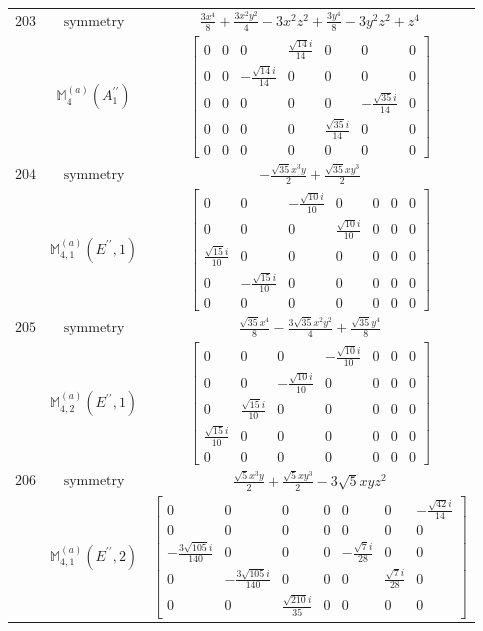 \documentclass[fleqn,8pt,landscape]{jsarticle}
\begin{document}
\begin{longtable}{ccc}
$ 203 $ & $ \text{symmetry} $ & $ \frac{3 x^{4}}{8} + \frac{3 x^{2} y^{2}}{4} - 3 x^{2} z^{2} + \frac{3 y^{4}}{8} - 3 y^{2} z^{2} + z^{4} $ \\
$  $ & $ \mathbb{M}_{4}^{(a)}(A_{1}^{\prime\prime}) $ & $ \begin{bmatrix} 0 & 0 & 0 & \frac{\sqrt{14} i}{14} & 0 & 0 & 0 \\ 0 & 0 & - \frac{\sqrt{14} i}{14} & 0 & 0 & 0 & 0 \\ 0 & 0 & 0 & 0 & 0 & - \frac{\sqrt{35} i}{14} & 0 \\ 0 & 0 & 0 & 0 & \frac{\sqrt{35} i}{14} & 0 & 0 \\ 0 & 0 & 0 & 0 & 0 & 0 & 0 \end{bmatrix} $ \\ \hline
$ 204 $ & $ \text{symmetry} $ & $ - \frac{\sqrt{35} x^{3} y}{2} + \frac{\sqrt{35} x y^{3}}{2} $ \\
$  $ & $ \mathbb{M}_{4,1}^{(a)}(E^{\prime\prime},1) $ & $ \begin{bmatrix} 0 & 0 & - \frac{\sqrt{10} i}{10} & 0 & 0 & 0 & 0 \\ 0 & 0 & 0 & \frac{\sqrt{10} i}{10} & 0 & 0 & 0 \\ \frac{\sqrt{15} i}{10} & 0 & 0 & 0 & 0 & 0 & 0 \\ 0 & - \frac{\sqrt{15} i}{10} & 0 & 0 & 0 & 0 & 0 \\ 0 & 0 & 0 & 0 & 0 & 0 & 0 \end{bmatrix} $ \\ \hline
$ 205 $ & $ \text{symmetry} $ & $ \frac{\sqrt{35} x^{4}}{8} - \frac{3 \sqrt{35} x^{2} y^{2}}{4} + \frac{\sqrt{35} y^{4}}{8} $ \\
$  $ & $ \mathbb{M}_{4,2}^{(a)}(E^{\prime\prime},1) $ & $ \begin{bmatrix} 0 & 0 & 0 & - \frac{\sqrt{10} i}{10} & 0 & 0 & 0 \\ 0 & 0 & - \frac{\sqrt{10} i}{10} & 0 & 0 & 0 & 0 \\ 0 & \frac{\sqrt{15} i}{10} & 0 & 0 & 0 & 0 & 0 \\ \frac{\sqrt{15} i}{10} & 0 & 0 & 0 & 0 & 0 & 0 \\ 0 & 0 & 0 & 0 & 0 & 0 & 0 \end{bmatrix} $ \\ \hline
$ 206 $ & $ \text{symmetry} $ & $ \frac{\sqrt{5} x^{3} y}{2} + \frac{\sqrt{5} x y^{3}}{2} - 3 \sqrt{5} x y z^{2} $ \\
$  $ & $ \mathbb{M}_{4,1}^{(a)}(E^{\prime\prime},2) $ & $ \begin{bmatrix} 0 & 0 & 0 & 0 & 0 & 0 & - \frac{\sqrt{42} i}{14} \\ 0 & 0 & 0 & 0 & 0 & 0 & 0 \\ - \frac{3 \sqrt{105} i}{140} & 0 & 0 & 0 & - \frac{\sqrt{7} i}{28} & 0 & 0 \\ 0 & - \frac{3 \sqrt{105} i}{140} & 0 & 0 & 0 & \frac{\sqrt{7} i}{28} & 0 \\ 0 & 0 & \frac{\sqrt{210} i}{35} & 0 & 0 & 0 & 0 \end{bmatrix} $ \\ \hline

\end{longtable}
\end{document}
